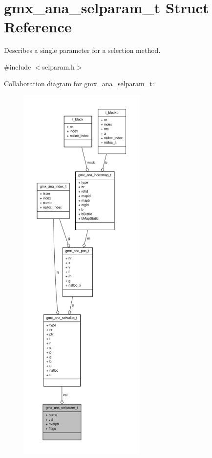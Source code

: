 \hypertarget{structgmx__ana__selparam__t}{\section{gmx\-\_\-ana\-\_\-selparam\-\_\-t \-Struct \-Reference}
\label{structgmx__ana__selparam__t}
}


\-Describes a single parameter for a selection method.  




{\ttfamily \#include $<$selparam.\-h$>$}



\-Collaboration diagram for gmx\-\_\-ana\-\_\-selparam\-\_\-t\-:
\nopagebreak
\begin{figure}[H]
\begin{center}
\leavevmode
\includegraphics[height=550pt]{structgmx__ana__selparam__t__coll__graph}
\end{center}
\end{figure}

